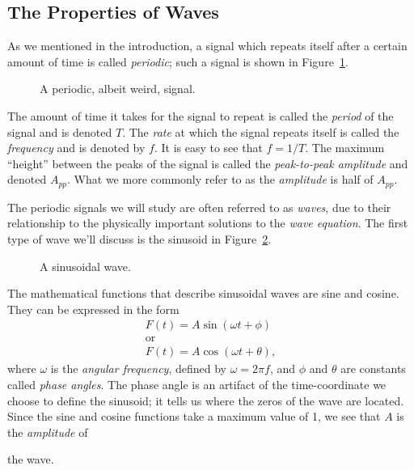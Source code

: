\subsection{The Properties of Waves}
\label{sec:SCOPE:waveprop}
As we mentioned in the introduction, a signal which repeats itself after a 
certain amount of time is called {\it periodic}; such a signal is shown in 
Figure~\ref{fig:scope:periodic}.
\begin{figure}[htb]
\centerline{\epsfxsize=12cm }
\caption{A periodic, albeit weird, signal.}
\label{fig:scope:periodic}
\end{figure}
The amount of time it takes for the signal to repeat is called the {\it period}
of the signal and is denoted $T$.  The {\it rate} at which 
the signal repeats itself is called the {\it frequency} and is denoted by $f$. 
It is easy to see that $f=1/T$.  The maximum ``height'' between the peaks of
the signal is called the {\it peak-to-peak amplitude} and denoted $A_{pp}$.
What we more commonly refer to as the {\it amplitude} is half of $A_{pp}$.  

The periodic signals we will study are often referred to as {\it waves}, due to
their relationship to the physically important solutions to the {\it wave
equation}.  The first type of wave we'll discuss is the sinusoid in 
Figure~\ref{fig:scope:sinusoid}.
\begin{figure}
\centerline{\epsfxsize=8cm }
\caption{A sinusoidal wave.}
\label{fig:scope:sinusoid}
\end{figure}
The mathematical functions that describe sinusoidal waves are sine and cosine.
They can be expressed in the form
\begin{eqnarray*}
& F(t) = A \sin(\omega t+\phi) & \\ 
& \mbox{or} & \\
& F(t) = A \cos(\omega t+\theta), &  
\end{eqnarray*}
where $\omega$ is the {\it angular frequency}, defined by $\omega=2\pi f$, and
$\phi$ and $\theta$ are constants called {\it phase angles}.  The phase angle
is an artifact of the time-coordinate we choose to define the sinusoid; it
tells us where the zeros of the wave are located.  Since the sine and cosine
functions take a maximum value of 1, we see that $A$ is the {\it amplitude} of 

the wave.

